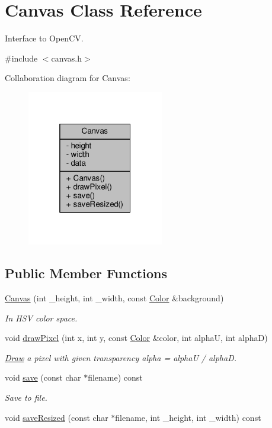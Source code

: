 \hypertarget{classCanvas}{}\section{Canvas Class Reference}
\label{classCanvas}


Interface to Open\+CV.  




{\ttfamily \#include $<$canvas.\+h$>$}



Collaboration diagram for Canvas\+:
\nopagebreak
\begin{figure}[H]
\begin{center}
\leavevmode
\includegraphics[width=169pt]{classCanvas__coll__graph}
\end{center}
\end{figure}
\subsection*{Public Member Functions}
\begin{DoxyCompactItemize}
\item 
\hyperlink{classCanvas_a04e5495c637170cd93c20dbcc56b7cce}{Canvas} (int \+\_\+height, int \+\_\+width, const \hyperlink{canvas_8h_a084a39206618848fb8bc9187d3758c87}{Color} \&background)
\begin{DoxyCompactList}\small\item\em In H\+SV color space. \end{DoxyCompactList}\item 
void \hyperlink{classCanvas_a74e163f47b09d23afc273c5024918280}{draw\+Pixel} (int x, int y, const \hyperlink{canvas_8h_a084a39206618848fb8bc9187d3758c87}{Color} \&color, int alphaU, int alphaD)
\begin{DoxyCompactList}\small\item\em \hyperlink{classDraw}{Draw} a pixel with given transparency alpha = alphaU / alphaD. \end{DoxyCompactList}\item 
void \hyperlink{classCanvas_a2fcf1999f81d5cbbb55271b7f3db1565}{save} (const char $\ast$filename) const 
\begin{DoxyCompactList}\small\item\em Save to file. \end{DoxyCompactList}\item 
void \hyperlink{classCanvas_a2d3e01d8ec83c99e36b76f780c1bfa3e}{save\+Resized} (const char $\ast$filename, int \+\_\+height, int \+\_\+width) const 
\end{DoxyCompactItemize}
